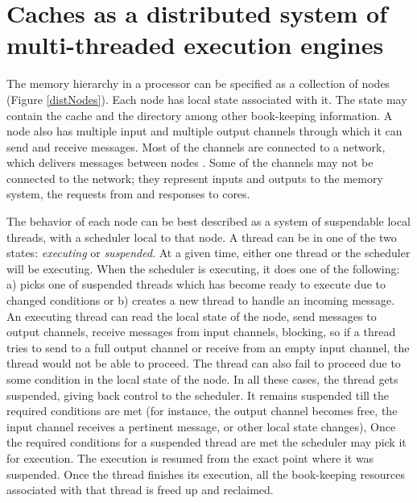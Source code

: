 \section{Caches as a distributed system of multi-threaded execution engines}
\label{sec:threads}

The memory hierarchy in a processor can be specified as a collection of nodes
(Figure \ref{distNodes}). Each node has local state associated with it. The
state may contain the cache and the directory among other book-keeping
information. A node also has multiple input and multiple output channels
through which it can send and receive messages. Most of the channels are
connected to a network, which delivers messages between nodes
. Some of the channels may not be connected to the network; they represent
inputs and outputs to the memory system, \viz the requests from and responses to
cores.

The behavior of each node can be best described as a system of suspendable local
threads, with a scheduler local to that node. A thread can be in one of the two
states: \emph{executing} or \emph{suspended}. At a given time, either one
thread or the scheduler will be executing. When the scheduler is executing,
it does one of the following: a) picks one of suspended threads
which has become ready to execute due to changed conditions or b) creates a new
thread to handle an incoming message. An executing thread can read the local
state of the node, send messages to output channels, receive messages from
input channels, \etc%
blocking, so if a thread tries to send to a full output channel or receive from
an empty input channel, the thread would not be able to proceed. The thread can
also fail to proceed due to some condition in the local state of the node. In
all these cases, the thread gets suspended, giving back control to the
scheduler. It remains suspended till the required conditions are met (for
instance, the output channel becomes free, the input channel receives a
pertinent message, or other local state changes), Once the required conditions
for a suspended thread are met the scheduler may pick it for execution. The
execution is resumed from the exact point where it was suspended. Once the
thread finishes its execution, all the book-keeping resources associated with
that thread is freed up and reclaimed.

